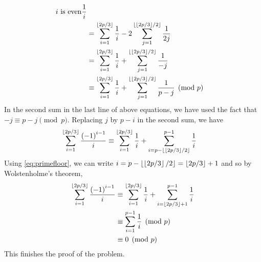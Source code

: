 \begin{solution}
\begin{align*}
{{							i\text{ is even}}}\frac {1}{i}\\
					&= \sum_{i = 1}^{\left\lfloor{2p/3}\right\rfloor}\frac {1}{i} - 2\sum_{j = 1}^{\left\lfloor{\left\lfloor{2p/3}\right\rfloor/2}\right\rfloor}\frac {1}{2j} \\
					&= \sum_{i = 1}^{\left\lfloor{2p/3}\right\rfloor}\frac {1}{i} + \sum_{j = 1}^{\left\lfloor{\left\lfloor{2p/3}\right\rfloor/2}\right\rfloor}\frac {1}{ - j}\\
					&\equiv\sum_{i = 1}^{\left\lfloor{2p/3}\right\rfloor}\frac {1}{i} + \sum_{j = 1}^{\left\lfloor{\left\lfloor{2p/3}\right\rfloor/2}\right\rfloor}\frac {1}{p - j} \pmod p
			\end{align*}
		In the second sum in the last line of above equations, we have used the fact that $-j \equiv p-j \pmod p$. Replacing $ j$ by $ p - i$ in the second sum, we have
		\begin{align*}
			\sum_{i = 1}^{\left\lfloor{2p/3}\right\rfloor}\frac {\left( - 1\right)^{i - 1}}{i}
				&\equiv \sum_{i = 1}^{\left\lfloor{2p/3}\right\rfloor}\frac {1}{i} + \sum_{i = p - \left\lfloor{\left\lfloor{2p/3}\right\rfloor/2}\right\rfloor}^{p - 1}\frac {1}{i}
		\end{align*}
		Using \eqref{eq:primefloor}, we can write $i = p - \left\lfloor{\left\lfloor{2p/3}\right\rfloor/2}\right\rfloor= \left\lfloor{2p/3}\right\rfloor+ 1$ and so by Wolstenholme's theorem,
		\begin{align*}
		\sum_{i = 1}^{\left\lfloor{2p/3}\right\rfloor}\frac {\left( - 1\right)^{i - 1}}{i}  &\equiv \sum_{i = 1}^{\left\lfloor{2p/3}\right\rfloor}\frac {1}{i} + \sum_{i = \left\lfloor{2p/3}\right\rfloor+ 1}^{p - 1}\frac {1}{i}\\
		&\equiv \sum_{i = 1}^{p - 1}\frac {1}{i}\pmod p\\
		&\equiv 0 \pmod p
		\end{align*}
		This finishes the proof of the problem.
	\end{solution}
